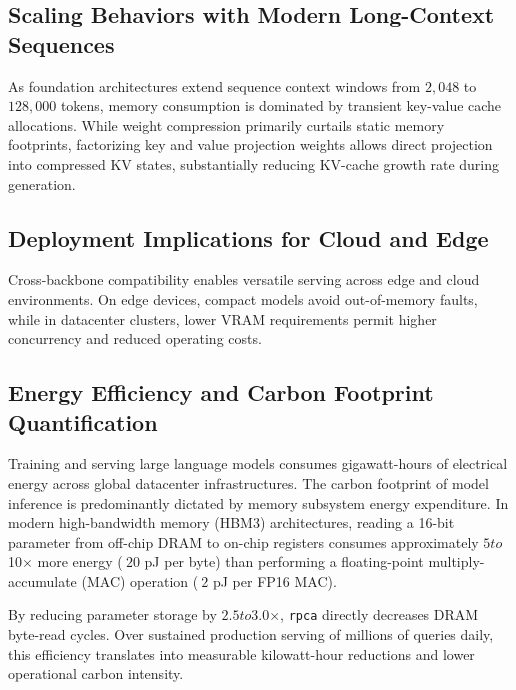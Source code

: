 \subsection{Scaling Behaviors with Modern Long-Context Sequences}
As foundation architectures extend sequence context windows from $2{,}048$ to $128{,}000$ tokens, memory consumption is dominated by transient key-value cache allocations. While weight compression primarily curtails static memory footprints, factorizing key and value projection weights allows direct projection into compressed KV states, substantially reducing KV-cache growth rate during generation.

\subsection{Deployment Implications for Cloud and Edge}
Cross-backbone compatibility enables versatile serving across edge and cloud environments. On edge devices, compact models avoid out-of-memory faults, while in datacenter clusters, lower VRAM requirements permit higher concurrency and reduced operating costs.

\subsection{Energy Efficiency and Carbon Footprint Quantification}
Training and serving large language models consumes gigawatt-hours of electrical energy across global datacenter infrastructures. The carbon footprint of model inference is predominantly dictated by memory subsystem energy expenditure. In modern high-bandwidth memory (HBM3) architectures, reading a 16-bit parameter from off-chip DRAM to on-chip registers consumes approximately $5$\times$ to $10$\times$ more energy ($~20$ pJ per byte) than performing a floating-point multiply-accumulate (MAC) operation ($~2$ pJ per FP16 MAC).

By reducing parameter storage by $2.5$\times$ to $3.0$\times$, \texttt{rpca} directly decreases DRAM byte-read cycles. Over sustained production serving of millions of queries daily, this efficiency translates into measurable kilowatt-hour reductions and lower operational carbon intensity.
